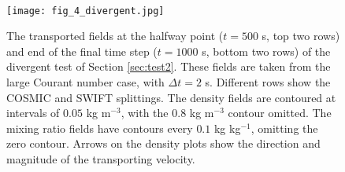 \documentclass[11pt,a4paper]{article}
\begin{document}
\\
\begin{figure}[ht!]
\centering
\texttt{[image: fig\_4\_divergent.jpg]}
\caption{The transported fields at the halfway point ($t=500$ s, top two rows) and end of the final time step ($t=1000$ s, bottom two rows) of the divergent test of Section \ref{sec:test2}. These fields are taken from the large Courant number case, with $\Delta t=2$ s. Different rows show the COSMIC and SWIFT splittings.
The density fields are contoured at intervals of $0.05$ kg m$^{-3}$, with the $0.8$ kg m$^{-3}$ contour omitted.
The mixing ratio fields have contours every $0.1$ kg kg$^{-1}$, omitting the zero contour.
Arrows on the density plots show the direction and magnitude of the transporting velocity.}\label{fig:test3}
\end{figure}
\end{document}
